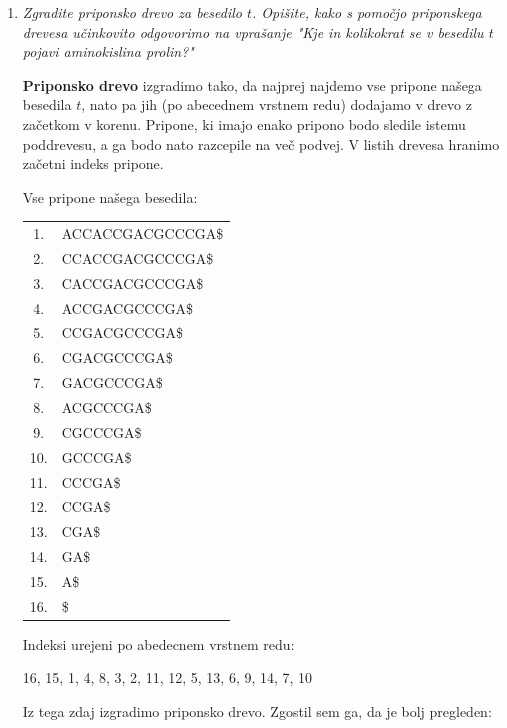 \documentclass{article}
\begin{document}
\begin{enumerate}
\begin{enumerate}
			\item \textit{Zgradite priponsko drevo za besedilo $t$. Opišite, kako s pomočjo
					priponskega drevesa učinkovito odgovorimo na vprašanje "Kje in kolikokrat se v
				besedilu $t$ pojavi aminokislina prolin?"}

				\textbf{Priponsko drevo} izgradimo tako, da najprej najdemo vse pripone našega besedila $t$,
				nato pa jih (po abecednem vrstnem redu) dodajamo v drevo z začetkom v korenu.
				Pripone, ki imajo enako pripono bodo sledile istemu poddrevesu, a ga bodo nato
				razcepile na več podvej. V listih drevesa hranimo začetni indeks pripone.

				Vse pripone našega besedila:

				\begin{center}
					\begin{tabular}[t]{c|l}
						1. & ACCACCGACGCCCGA\$ \\
						2. & CCACCGACGCCCGA\$ \\
						3. & CACCGACGCCCGA\$ \\
						4. & ACCGACGCCCGA\$ \\
						5. & CCGACGCCCGA\$ \\
						6. & CGACGCCCGA\$ \\
						7. & GACGCCCGA\$ \\
						8. & ACGCCCGA\$ \\
						9. & CGCCCGA\$ \\
						10. & GCCCGA\$ \\
						11. & CCCGA\$ \\
						12. & CCGA\$ \\
						13. & CGA\$ \\
						14. & GA\$ \\
						15. & A\$ \\
						16. & \$ \\
					\end{tabular}
				\end{center}

				Indeksi urejeni po abedecnem vrstnem redu:

				\begin{center}
					16, 15, 1, 4, 8, 3, 2, 11, 12, 5, 13, 6, 9, 14, 7, 10
				\end{center}

				Iz tega zdaj izgradimo priponsko drevo. Zgostil sem ga, da je bolj
				pregleden:


\end{enumerate}
\end{enumerate}
\end{document}
